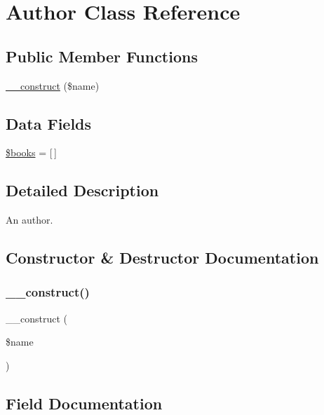 \hypertarget{class_author}{}\section{Author Class Reference}
\label{class_author}
\subsection*{Public Member Functions}
\begin{DoxyCompactItemize}
\item 
\mbox{\hyperlink{class_author_a4717bbfc70a40a57ee741ed70766c309}{\+\_\+\+\_\+construct}} (\$name)
\end{DoxyCompactItemize}
\subsection*{Data Fields}
\begin{DoxyCompactItemize}
\item 
\mbox{\hyperlink{class_author_a907555e6b68ea0e7a98690e57bc2878a}{\$books}} = \mbox{[}$\,$\mbox{]}
\end{DoxyCompactItemize}


\subsection{Detailed Description}
An author. 

\subsection{Constructor \& Destructor Documentation}
\mbox{\label{class_author_a4717bbfc70a40a57ee741ed70766c309}} 
\subsubsection{\texorpdfstring{\+\_\+\+\_\+construct()}{\_\_construct()}}
{\footnotesize\ttfamily \+\_\+\+\_\+construct (\begin{DoxyParamCaption}\item[{}]{\$name }\end{DoxyParamCaption})}



\subsection{Field Documentation}
\mbox{\label{class_author_a907555e6b68ea0e7a98690e57bc2878a}} 
